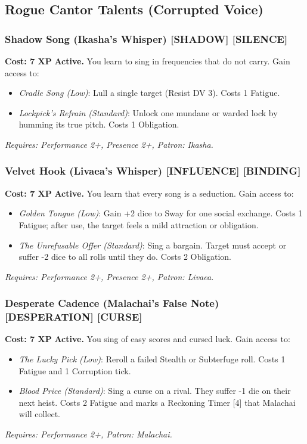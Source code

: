 \subsection*{Rogue Cantor Talents (Corrupted Voice)}
\label{sec:prestige-rogue-cantor}

\subsubsection*{Shadow Song (Ikasha's Whisper) \textnormal{[SHADOW] [SILENCE]}}
\label{talent:shadow-song}
\textbf{Cost: 7 XP} \textbf{Active.} You learn to sing in frequencies that do not carry. Gain access to:
\begin{itemize}
\item \textit{Cradle Song (Low)}: Lull a single target (Resist DV 3). Costs 1 Fatigue.
\item \textit{Lockpick's Refrain (Standard)}: Unlock one mundane or warded lock by humming its true pitch. Costs 1 Obligation.
\end{itemize}
\textit{Requires: Performance 2+, Presence 2+, Patron: Ikasha.}

\subsubsection*{Velvet Hook (Livaea's Whisper) \textnormal{[INFLUENCE] [BINDING]}}
\label{talent:velvet-hook}
\textbf{Cost: 7 XP} \textbf{Active.} You learn that every song is a seduction. Gain access to:
\begin{itemize}
\item \textit{Golden Tongue (Low)}: Gain +2 dice to Sway for one social exchange. Costs 1 Fatigue; after use, the target feels a mild attraction or obligation.
\item \textit{The Unrefusable Offer (Standard)}: Sing a bargain. Target must accept or suffer -2 dice to all rolls until they do. Costs 2 Obligation.
\end{itemize}
\textit{Requires: Performance 2+, Presence 2+, Patron: Livaea.}

\subsubsection*{Desperate Cadence (Malachai's False Note) \textnormal{[DESPERATION] [CURSE]}}
\label{talent:desperate-cadence}
\textbf{Cost: 7 XP} \textbf{Active.} You sing of easy scores and cursed luck. Gain access to:
\begin{itemize}
\item \textit{The Lucky Pick (Low)}: Reroll a failed Stealth or Subterfuge roll. Costs 1 Fatigue and 1 Corruption tick.
\item \textit{Blood Price (Standard)}: Sing a curse on a rival. They suffer -1 die on their next heist. Costs 2 Fatigue and marks a Reckoning Timer [4] that Malachai will collect.
\end{itemize}
\textit{Requires: Performance 2+, Patron: Malachai.}


